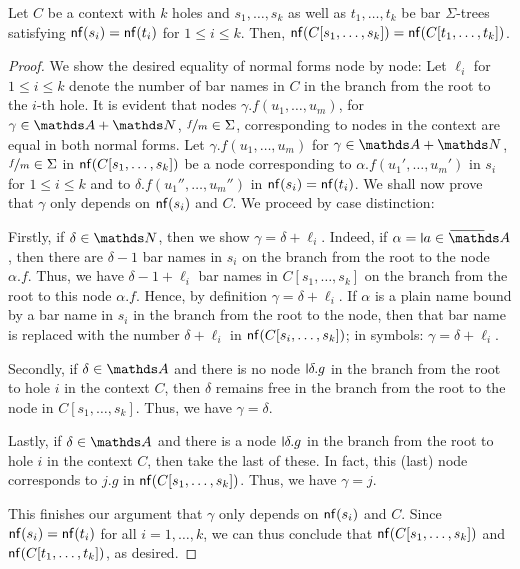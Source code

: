 \documentclass[a4paper,UKenglish,cleveref,autoref,thm-restate,numberwithinsect,final]{lipics-v2021}
\begin{document}
    \begin{lemma}\label{lem:TnfstCC}
        Let $C$ be a context with $k$ holes and $s_1, \dots, s_k$ as well as $t_1, \dots, t_k$ be bar $\Sigma$-trees
        satisfying $\mathsf{nf}(s_i) = \mathsf{nf}(t_i)$ for $1 \leqslant i \leqslant k$. Then, $\mathsf{nf}(C[s_1, \dots, s_k]) =
        \mathsf{nf}(C[t_1, \dots, t_k])$.
    \end{lemma}
    \begin{proof}
      We show the desired equality of normal forms node by node: Let $\ell_i$ for
      $1 \leqslant i \leqslant k$ denote the number of bar names in $C$ in the branch from the
      root to the $i$-th hole. It is evident that nodes $\gamma.f(u_1, \dots, u_m)$, for
      $\gamma \in \names + \Nat$, $\nicefrac{f}{m} \in \Sigma$, corresponding to nodes in the
      context are equal in both normal forms.  Let $\gamma.f(u_1, \dots, u_m)$ for
      $\gamma \in \names + \Nat$, $\nicefrac{f}{m} \in \Sigma$ in $\mathsf{nf}(C[s_1, \dots, s_k])$ be
      a node corresponding to $\alpha.f(u_1', \dots, u_m')$ in $s_i$ for
      $1 \leqslant i \leqslant k$ and to $\delta.f(u_1'', \dots, u_m'')$ in $\mathsf{nf}(s_i) =
      \mathsf{nf}(t_i)$. We shall now prove that $\gamma$ only depends on $\mathsf{nf}(s_i)$ and $C$.  
      We proceed by case distinction:
        
      Firstly, if $\delta \in \Nat$, then we show $\gamma = \delta + \ell_i$. Indeed, if
      $\alpha = \newletter{a} \in \barNames$, then there are $\delta - 1$ bar names in $s_i$ on
      the branch from the root to the node $\alpha.f$. Thus, we have $\delta - 1 + \ell_i$ bar
      names in $C[s_1, \dots, s_k]$ on the branch from the root to this node $\alpha.f$. Hence,
      by definition $\gamma = \delta + \ell_i$. If $\alpha$ is a plain name bound by a bar name
      in $s_i$ in the branch from the root to the node, then that bar name is replaced with the number
      $\delta + \ell_i$ in $\mathsf{nf}(C[s_i, \ldots, s_k])$; in symbols: $\gamma = \delta + \ell_i$.

      Secondly, if $\delta \in \names$ and there is no node $\newletter{\delta}.g$ in the
      branch from the root to hole $i$ in the context $C$, then $\delta$ remains free in the
      branch from the root to the node in $C[s_1, \ldots, s_k]$. Thus, we have
      $\gamma = \delta$.

      Lastly, if $\delta \in \names$ and there is a node $\newletter{\delta}.g$ in the branch
      from the root to hole $i$ in the context $C$, then take the last of these. In fact,
      this (last) node corresponds to $j.g$ in $\mathsf{nf}(C[s_1, \dots, s_k])$. Thus, we have $\gamma
      = j$.

      This finishes our argument that $\gamma$ only depends on $\mathsf{nf}(s_i)$ and $C$. Since
      $\mathsf{nf}(s_i) = \mathsf{nf}(t_i)$ for all $i = 1, \ldots, k$, we can thus conclude that
      $\mathsf{nf}(C[s_1, \ldots, s_k])$ and $\mathsf{nf}(C[t_1, \ldots, t_k])$, as desired.
    \end{proof}
\end{document}
